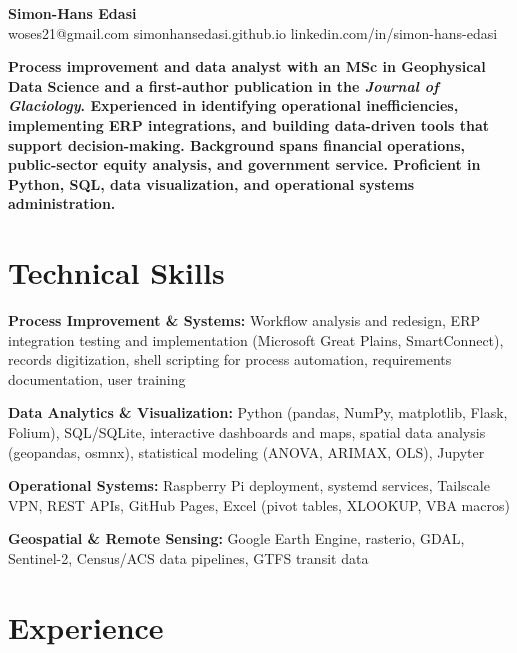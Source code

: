 \documentclass[11pt,a4paper]{article}
\begin{document}
\noindent{}

\begin{center}
    {\LARGE \textbf{Simon-Hans Edasi}} \\[6pt]
    woses21@gmail.com \hfill \textbar \hfill
    simonhansedasi.github.io \hfill \textbar \hfill
    linkedin.com/in/simon-hans-edasi
\end{center}

\vspace{0.3cm}

\noindent
\textbf{Process improvement and data analyst with an MSc in Geophysical Data Science and a first-author publication in the \textit{Journal of Glaciology}. Experienced in identifying operational inefficiencies, implementing ERP integrations, and building data-driven tools that support decision-making. Background spans financial operations, public-sector equity analysis, and government service. Proficient in Python, SQL, data visualization, and operational systems administration.}

\section*{Technical Skills}

\noindent
\textbf{Process Improvement \& Systems:} Workflow analysis and redesign, ERP integration testing and implementation (Microsoft Great Plains, SmartConnect), records digitization, shell scripting for process automation, requirements documentation, user training

\noindent
\textbf{Data Analytics \& Visualization:} Python (pandas, NumPy, matplotlib, Flask, Folium), SQL/SQLite, interactive dashboards and maps, spatial data analysis (geopandas, osmnx), statistical modeling (ANOVA, ARIMAX, OLS), Jupyter

\noindent
\textbf{Operational Systems:} Raspberry Pi deployment, systemd services, Tailscale VPN, REST APIs, GitHub Pages, Excel (pivot tables, XLOOKUP, VBA macros)

\noindent
\textbf{Geospatial \& Remote Sensing:} Google Earth Engine, rasterio, GDAL, Sentinel-2, Census/ACS data pipelines, GTFS transit data

\section*{Experience}
\end{document}
